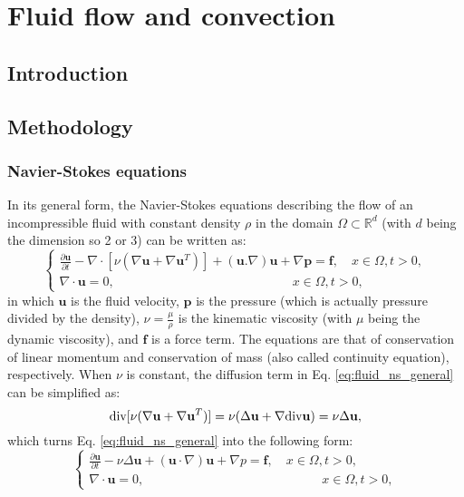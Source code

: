 \chapter{Fluid flow and convection}\label{ch:fluid}

\section{Introduction}


\section{Methodology}

\subsection{Navier-Stokes equations}

In its general form, the Navier-Stokes equations describing the flow of an incompressible fluid with constant density $\rho$ in the domain $\Omega \subset \mathbb{R}^{d}$ (with $d$ being the dimension so 2 or 3) can be written as:
\begin{equation} \label{eq:fluid_ns_general}
\left\{ {\begin{array}{*{20}{l}}
\displaystyle  {\frac{{\partial {\mathbf{u}}}}{{\partial t}} - {\nabla\cdot}[\nu(\nabla {\mathbf{u}} + \nabla {{\mathbf{u}}^T})] + ({\mathbf{u}}.\nabla ){\mathbf{u}} + \nabla {\mathbf{p}} = {\mathbf{f}},\quad x \in \Omega ,t > 0,} \\ 
\displaystyle  {\nabla\cdot{\mathbf{u}} = 0,\quad \quad \quad \quad \quad \quad \quad \quad \quad \quad \quad \quad \quad \quad x \in \Omega ,t > 0,} 
\end{array}} \right.
\end{equation}
in which $\mathbf{u}$ is the fluid velocity, $\mathbf{p}$ is the pressure (which is actually pressure divided by the density), $\nu = \frac{\mu}{\rho}$ is the kinematic viscosity (with $\mu$ being the dynamic viscosity), and 
$\mathbf{f}$ is a force term. The equations are that of conservation of linear momentum and conservation of mass (also called continuity equation), respectively. When $\nu$ is constant, the diffusion term in Eq. \ref{eq:fluid_ns_general} can be simplified as:
\begin{equation}
\text{div} [\nu(\nabla {\bf u}+\nabla {\bf u}^{T})] =\nu (\Delta {\bf u} + \nabla \text{div} {\bf u})=\nu \Delta {\bf u},
\end{equation}
which turns Eq. \ref{eq:fluid_ns_general} into the following form:
\begin{equation}  \label{eq:fluid_ns}
\left\{ {\begin{array}{*{20}{l}}
\displaystyle  {\frac{{\partial {\mathbf{u}}}}{{\partial t}} - \nu\Delta{\mathbf{u}} + \left( {{\mathbf{u}} \cdot \nabla } \right) {\mathbf{u}} + \nabla p = {\mathbf{f}},\quad x \in \Omega ,t > 0,} \\ 
 \displaystyle {\nabla\cdot{\mathbf{u}} = 0,\quad \quad \quad \quad \quad \quad \quad \quad \quad \quad \quad \quad \quad \quad x \in \Omega ,t > 0,} 
\end{array}} \right.
\end{equation}

